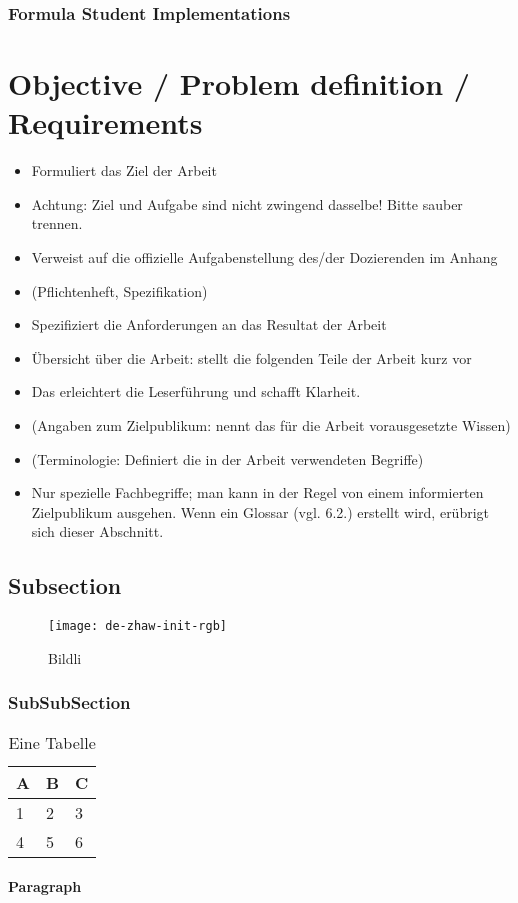 \subsubsection{Formula Student Implementations}




\lipsum[1] \cite{quelle2}

\section{Objective / Problem definition / Requirements}
\begin{itemize}
    \item Formuliert das Ziel der Arbeit
    \item Achtung: Ziel und Aufgabe sind nicht zwingend dasselbe! Bitte sauber trennen.
    \item Verweist auf die offizielle Aufgabenstellung des/der Dozierenden im Anhang
    \item (Pflichtenheft, Spezifikation)
    \item Spezifiziert die Anforderungen an das Resultat der Arbeit
    \item Übersicht über die Arbeit: stellt die folgenden Teile der Arbeit kurz vor
    \item Das erleichtert die Leserführung und schafft Klarheit.
    \item (Angaben zum Zielpublikum: nennt das für die Arbeit vorausgesetzte Wissen)
    \item (Terminologie: Definiert die in der Arbeit verwendeten Begriffe)
    \item Nur spezielle Fachbegriffe; man kann in der Regel von einem informierten Zielpublikum ausgehen.
    Wenn ein Glossar (vgl. 6.2.) erstellt wird, erübrigt sich dieser Abschnitt.
\end{itemize}

\lipsum[1] \cite{quelle2}

\subsection{Subsection}
\lipsum[1] \cite{quelle1}

\begin{figure}[H]
\centering
\texttt{[image: de-zhaw-init-rgb]}
\caption{Bildli}
\label{fig:bildli1}
\end{figure}


\subsubsection{SubSubSection}
\lipsum[1]
\begin{table}[H]
\centering
\caption{Eine Tabelle}
\label{tab:my-table}
\begin{tabular}{|l|l|l|}
\hline
\textbf{A} & \textbf{B} & \textbf{C} \\ \hline
1          & 2          & 3          \\ \hline
4          & 5          & 6          \\ \hline
\end{tabular}
\end{table}

\paragraph{Paragraph}
\lipsum[1]

 


